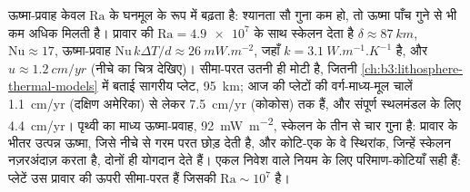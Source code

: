 ऊष्मा-प्रवाह केवल $\mathrm{Ra}$ के घनमूल के रूप में बढ़ता है: श्यानता
सौ गुना कम हो, तो ऊष्मा पाँच गुने से भी कम अधिक मिलती है।
प्रावार की $\mathrm{Ra} = \num{4.9e7}$ के साथ स्केलन देता है $\delta \approx \qty{87}{km}$,
$\mathrm{Nu} \approx 17$, ऊष्मा-प्रवाह $\mathrm{Nu}\,k\Delta T/d \approx
\qty{26}{mW.m^{-2}}$, जहाँ $k = \qty{3.1}{W.m^{-1}.K^{-1}}$ है, और $u \approx
\qty{1.2}{cm/yr}$ (नीचे का चित्र देखिए)। सीमा-परत उतनी ही मोटी है, जितनी
\cref{ch:b3:lithosphere-thermal-models} में बताई सागरीय प्लेट, \qty{95}{km};
आज की प्लेटों की वर्ग-माध्य-मूल चालें \qty{1.1}{cm/yr} (दक्षिण
अमेरिका) से लेकर \qty{7.5}{cm/yr} (कोकोस) तक हैं, और संपूर्ण
स्थलमंडल के लिए \qty{4.4}{cm/yr}। पृथ्वी का माध्य ऊष्मा-प्रवाह, \qty{92}{mW.m^{-2}}, स्केलन के
तीन से चार गुना है: प्रावार के भीतर उत्पन्न ऊष्मा, जिसे नीचे से गरम परत छोड़ देती है,
और कोटि-एक के वे स्थिरांक, जिन्हें स्केलन नज़रअंदाज़ करता है, दोनों ही योगदान देते हैं।
एकल निवेश वाले नियम के लिए परिमाण-कोटियाँ सही हैं:
प्लेटें उस प्रावार की ऊपरी सीमा-परत हैं जिसकी $\mathrm{Ra}
\sim 10^7$ है।

